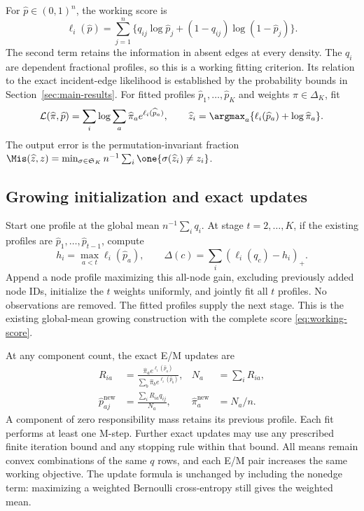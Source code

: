 For $\widehat p\in(0,1)^n$, the working score is
\begin{equation}
 \ell_i(\widehat p)
 =\sum_{j=1}^n\{q_{ij}\log\widehat p_j
           +(1-q_{ij})\log(1-\widehat p_j)\}.
 \label{eq:working-score}
\end{equation}
The second term retains the information in absent edges at every density. The $q_i$ are dependent fractional profiles, so this is a working fitting criterion. Its relation to the exact incident-edge likelihood is established by the probability bounds in Section~\ref{sec:main-results}.
For fitted profiles $\widehat p_1,\ldots,\widehat p_K$ and weights $\widehat\pi\in\Delta_K$, fit
\begin{equation}
 \mathcal L(\widehat\pi,\widehat p)
 =\sum_i\log\sum_a\widehat\pi_a e^{\ell_i(\widehat p_a)},\qquad
 \widehat z_i=\argmax_a\{\ell_i(\widehat p_a)+\log\widehat\pi_a\}.
 \label{eq:mixture-and-decode}
\end{equation}
The output error is the permutation-invariant fraction
$\Mis(\widehat z,z)=\min_{\sigma\in\mathfrak S_K}n^{-1}\sum_i\one\{\sigma(\widehat z_i)\ne z_i\}$.

\subsection{Growing initialization and exact updates}
\label{sec:growing-branch}
Start one profile at the global mean $n^{-1}\sum_iq_i$. At stage $t=2,\ldots,K$, if the existing profiles are $\widehat p_1,\ldots,\widehat p_{t-1}$, compute
\begin{equation}
 h_i=\max_{a<t}\ell_i(\widehat p_a),\qquad
 \Delta(c)=\sum_i(\ell_i(q_c)-h_i)_+.
 \label{eq:growing-gain}
\end{equation}
Append a node profile maximizing this all-node gain, excluding previously added node IDs, initialize the $t$ weights uniformly, and jointly fit all $t$ profiles. No observations are removed. The fitted profiles supply the next stage. This is the existing global-mean growing construction with the complete score \eqref{eq:working-score}.

At any component count, the exact E/M updates are
\begin{align}
 R_{ia}&=\frac{\widehat\pi_a e^{\ell_i(\widehat p_a)}}
                  {\sum_b\widehat\pi_b e^{\ell_i(\widehat p_b)}},
 &N_a&=\sum_iR_{ia},\label{eq:responsibilities}\\
 \widehat p_{aj}^{\mathrm{new}}&=\frac{\sum_iR_{ia}q_{ij}}{N_a},
 &\widehat\pi_a^{\mathrm{new}}&=N_a/n.
 \label{eq:mstep}
\end{align}
A component of zero responsibility mass retains its previous profile. Each fit performs at least one M-step. Further exact updates may use any prescribed finite iteration bound and any stopping rule within that bound. All means remain convex combinations of the same $q$ rows, and each E/M pair increases the same working objective. The update formula is unchanged by including the nonedge term: maximizing a weighted Bernoulli cross-entropy still gives the weighted mean.

